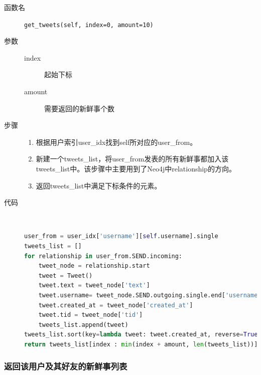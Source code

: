\documentclass{yaldc}
\begin{document}
\begin{description}
    \item[函数名] \verb|get_tweets(self, index=0, amount=10)|
    \item[参数]
        \begin{description}
            \item[index] 起始下标
            \item[amount] 需要返回的新鲜事个数
        \end{description}
    \item[步骤]
        \begin{enumerate}
            \item 根据用户索引user\_idx找到self所对应的user\_from。
            \item 新建一个tweets\_list，将user\_from发表的所有新鲜事都加入该
                tweets\_list中。该步骤中主要用到了Neo4j中relationship的方向。
            \item 返回tweets\_list中满足下标条件的元素。
        \end{enumerate}
    \item[代码] ~
        \begin{lstlisting}[language=Python]
user_from = user_idx['username'][self.username].single
tweets_list = []
for relationship in user_from.SEND.incoming:
    tweet_node = relationship.start
    tweet = Tweet()
    tweet.text = tweet_node['text']
    tweet.username= tweet_node.SEND.outgoing.single.end['username']
    tweet.created_at = tweet_node['created_at']
    tweet.tid = tweet_node['tid']
    tweets_list.append(tweet)
tweets_list.sort(key=lambda tweet: tweet.created_at, reverse=True)
return tweets_list[index : min(index + amount, len(tweets_list))]
        \end{lstlisting}
\end{description}

\subsubsection{返回该用户及其好友的新鲜事列表}
\end{document}
